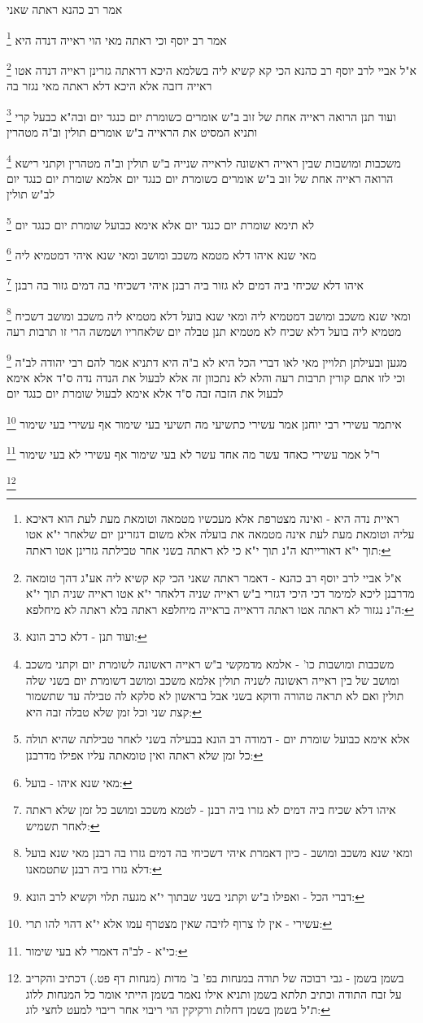 \documentclass[12pt, openany]{book}
\newcommand{\footnotecomment}[1]{
	\renewcommand\thefootnote{}
	\footnote{#1}}
\newcommand{\commenta}[1]{\footnotecomment{#1}}
\begin{document}
{{אמר רב כהנא ראתה שאני 
\commenta{ראיית נדה היא - ואינה מצטרפת אלא מעכשיו מטמאה וטומאת מעת לעת הוא דאיכא עליה וטומאת מעת לעת אינה מטמאה את בועלה אלא משום דגזרינן יום שלאחר י"א אטו תוך י"א דאורייתא ה"נ תוך י"א כי לא ראתה בשני אחר טבילתה גזרינן אטו ראתה:}
אמר רב יוסף וכי ראתה מאי הוי ראייה דנדה היא 
\commenta{א"ל אביי לרב יוסף רב כהנא - דאמר ראתה שאני הכי קא קשיא ליה אע"ג דהך טומאה מדרבנן ליכא למימר דכי היכי דגזרי ב"ש ראייה שניה דלאחר י"א אטו ראייה שניה תוך י"א ה"נ נגזור לא ראתה אטו ראתה דראייה בראייה מיחלפא ראתה בלא ראתה לא מיחלפא:}
א"ל אביי לרב יוסף רב כהנא הכי קא קשיא ליה בשלמא היכא דראתה גזרינן ראייה דנדה אטו ראייה דזבה אלא היכא דלא ראתה מאי נגזר בה 
\commenta{ועוד תנן - דלא כרב הונא:}
ועוד תנן הרואה ראייה אחת של זוב ב"ש אומרים כשומרת יום כנגד יום ובה"א כבעל קרי
ותניא המסיט את הראייה ב"ש אומרים תולין וב"ה מטהרין 
\commenta{משכבות ומושבות כו' - אלמא מדמקשי ב"ש ראייה ראשונה לשומרת יום וקתני משכב ומושב של בין ראייה ראשונה לשניה תולין אלמא משכב ומושב דשומרת יום בשני שלה תולין ואם לא תראה טהורה ודוקא בשני אבל בראשון לא סלקא לה טבילה עד שתשמור קצת שני וכל זמן שלא טבלה זבה היא:}
משכבות ומושבות שבין ראייה ראשונה לראייה שנייה ב"ש תולין וב"ה מטהרין 
וקתני רישא הרואה ראייה אחת של זוב ב"ש אומרים כשומרת יום כנגד יום אלמא שומרת יום כנגד יום לב"ש תולין 
\commenta{אלא אימא כבועל שומרת יום - דמודה רב הונא בבעילה בשני לאחר טבילתה שהיא תולה כל זמן שלא ראתה ואין טומאתה עליו אפילו מדרבנן:}
לא תימא שומרת יום כנגד יום אלא אימא כבועל שומרת יום כנגד יום 
\commenta{מאי שנא איהו - בועל:}
מאי שנא איהו דלא מטמא משכב ומושב ומאי שנא איהי דמטמיא ליה 
\commenta{איהו דלא שכיח ביה דמים לא גזרו ביה רבנן - לטמא משכב ומושב כל זמן שלא ראתה לאחר תשמיש:}
איהו דלא שכיחי ביה דמים לא גזור ביה רבנן איהי דשכיחי בה דמים גזור בה רבנן 
\commenta{ומאי שנא משכב ומושב - כיון דאמרת איהי דשכיחי בה דמים גזרו בה רבנן מאי שנא בועל דלא גזרו ביה רבנן שתטמאנו:}
ומאי שנא משכב ומושב דמטמיא ליה ומאי שנא בועל דלא מטמיא ליה 
משכב ומושב דשכיח מטמיא ליה בועל דלא שכיח לא מטמיא 
תנן טבלה יום שלאחריו ושמשה הרי זו תרבות רעה
\commenta{דברי הכל - ואפילו ב"ש וקתני בשני שבתוך י"א מגעה תלוי וקשיא לרב הונא:}
מגען ובעילתן תלויין מאי לאו דברי הכל היא 
לא ב"ה היא דתניא אמר להם רבי יהודה לב"ה וכי לזו אתם קורין תרבות רעה והלא לא נתכוון זה אלא לבעול את הנדה נדה ס"ד 
אלא אימא לבעול את הזבה זבה ס"ד אלא אימא לבעול שומרת יום כנגד יום 
\commenta{עשירי - אין לו צרוף לזיבה שאין מצטרף עמו אלא י"א דהוי להו תרי:}
איתמר עשירי רבי יוחנן אמר עשירי כתשיעי מה תשיעי בעי שימור אף עשירי בעי שימור 
\commenta{כי"א - לב"ה דאמרי לא בעי שימור:}
ר"ל אמר עשירי כאחד עשר מה אחד עשר לא בעי שימור אף עשירי לא בעי שימור 
\commenta{בשמן בשמן - גבי רבוכה של תודה במנחות בפ' ב' מדות (מנחות דף פט.) דכתיב והקריב על זבח התודה וכתיב תלתא בשמן ותניא אילו נאמר בשמן הייתי אומר כל המנחות ללוג ת"ל בשמן בשמן דחלות ורקיקין הוי ריבוי אחר ריבוי למעט לחצי לוג:}
}}
\end{document}
